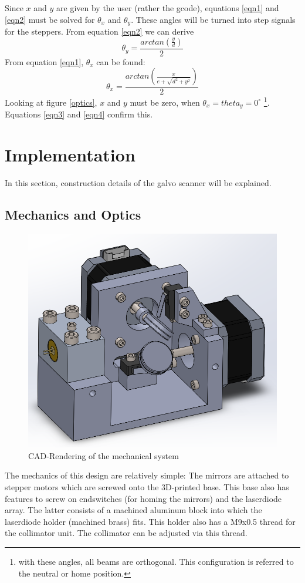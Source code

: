 \documentclass[a4paper, 11pt]{scrartcl}
\begin{document}
Since $x$ and $y$ are given by the user (rather the gcode), equations \ref{eqn1} and \ref{eqn2} must be solved for $\theta_x$ and $\theta_y$. These angles will be turned into step signals for the steppers. From equation \ref{eqn2} we can derive 
\begin{equation}\label{eqn3}
\theta_y = \frac{arctan(\frac{y}{d})}{2}
\end{equation} 
From equation \ref{eqn1}, $\theta_x$ can be found:
\begin{equation}\label{eqn4}
\theta_x=\frac{arctan\left( \frac{x}{e+\sqrt{d^2+y^2}}\right) }{2}
\end{equation}
Looking at figure \ref{optics}, $x$ and $y$ must be zero, when $\theta_x=theta_y=0^\circ$ \footnote{with these angles, all beams are orthogonal. This configuration is referred to the neutral or home position.}. Equations \ref{eqn3} and \ref{eqn4} confirm this. 

\section{Implementation}
In this section, construction details of the galvo scanner will be explained.
\subsection{Mechanics and Optics}
\begin{figure}[H]
\begin{center}
\includegraphics[width=15cm]{img/mechanics.png}
\caption{CAD-Rendering of the mechanical system}
\label{mechanics}
\end{center}
\end{figure}
The mechanics of this design are relatively simple: The mirrors are attached to stepper motors which are screwed onto the 3D-printed base. This base also has features to screw on endswitches (for homing the mirrors) and the laserdiode array. The latter consists of a machined aluminum block into which the laserdiode holder (machined brass) fits. This holder also has a M9x0.5 thread for the collimator unit. The collimator can be adjusted via this thread.
\end{document}
